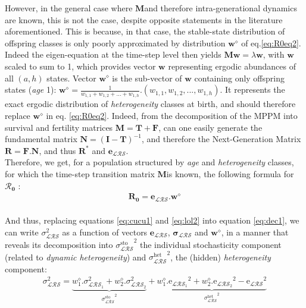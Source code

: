\documentclass[10pt,a4paper]{article}
\newcommand{\M}{$\mathbf{M}$}
\newcommand{\Rzero}{$\boldsymbol{\mathcal{R}_{0}}$  }
\begin{document}
{{However, in the general case where \M and therefore intra-generational dynamics are known, this is not the case, despite opposite statements in the literature aforementioned. This is because, in that case, the stable-state distribution of offspring classes is only poorly approximated by distribution $\mathbf{w^{\diamond}}$ of eq.\ref{eq:R0eq2}. Indeed the eigen-equation at the time-step level then yields $\mathbf{M}\mathbf{w}=\lambda\mathbf{w}$,
 with $\mathbf{w}$ scaled to sum to 1, which provides vector $\mathbf{w}$ representing ergodic abundances of all $(a,h)$ states.
Vector $\mathbf{w^{\diamond}}$ is the sub-vector of $\mathbf{w}$ containing only offspring states (\emph{age} 1):
$
\mathbf{w^{\diamond}}=\frac{1}{w_{1,1}+w_{1,2}+ ... +w_{1,h}}.(w_{1,1},w_{1,2}, ... ,w_{1,h})
$.
It represents the exact ergodic distribution of \emph{heterogeneity} classes at birth, and should therefore replace $\mathbf{w^{\diamond}}$ in eq. \ref{eq:R0eq2}. Indeed, from the decomposition of the MPPM into survival and fertility matrices $\mathbf{M}=\mathbf{T}+\mathbf{F}$, can one easily generate the fundamental matrix $\mathbf{N}=(\mathbf{I}-\mathbf{T})^{-1}$, and therefore the Next-Generation Matrix $\mathbf{R}=\mathbf{F}.\mathbf{N}$, and thus $\mathbf{R^{*}}$ and $\mathbf{e}_{\mathcal{LRS}}$. \\
 
 Therefore, we get, for a population structured by \emph{age} and \emph{heterogeneity} classes, for which the time-step transition matrix \M is known, the following formula for \Rzero:
\begin{eqnarray}
\mathbf{R_{0}}=\mathbf{e}_{\mathcal{LRS}}.\mathbf{w}^{\diamond}
\label{eq:R0eq} 
\end{eqnarray}}
\label{box:noteonR0}
}\\


And thus, replacing equations \ref{eq:cucu1} and \ref{eq:lol2} into equation \ref{eq:dec1},  we can write $\sigma^{2}_{\mathcal{LRS}}$ as a function of  vectors $\mathbf{e_{\mathcal{LRS}}}$, $\mathbf{\boldsymbol{\sigma}_{\mathcal{LRS}}}$ and $\bm{w^{\diamond}}$, in a manner that reveals its decomposition into ${\sigma_{\mathcal{LRS}}^{\mathrm{sto}}}^{2}$ the individual stochasticity component (related to \emph{dynamic heterogeneity}) and ${\sigma_{\mathcal{LRS}}^{\mathrm{het}}}^{2}$, the (hidden) \emph{heterogeneity} component:
 \begin{eqnarray}
\sigma^{2}_{\mathcal{LRS}} =\underbrace{ w^{\diamond}_{1}.\sigma^{2}_{\mathcal{LRS}_1}  +w^{\diamond}_{2}.\sigma^{2}_{\mathcal{LRS}_2}}_{{\sigma_{\mathcal{LRS}}^{\mathrm{sto}}}^{2}}+\underbrace{ w^{\diamond}_{1}.\mathrm{e_{\mathcal{LRS}_1}}^2+w^{\diamond}_{2}.\mathrm{e_{\mathcal{LRS}_2}}^2-\mathrm{e_{\mathcal{LRS}}}^2}_{{\sigma_{\mathcal{LRS}}^{\mathrm{het}}}^{2}}
\label{eq:hetvarLRO} 
 \end{eqnarray}
 
\end{document}

